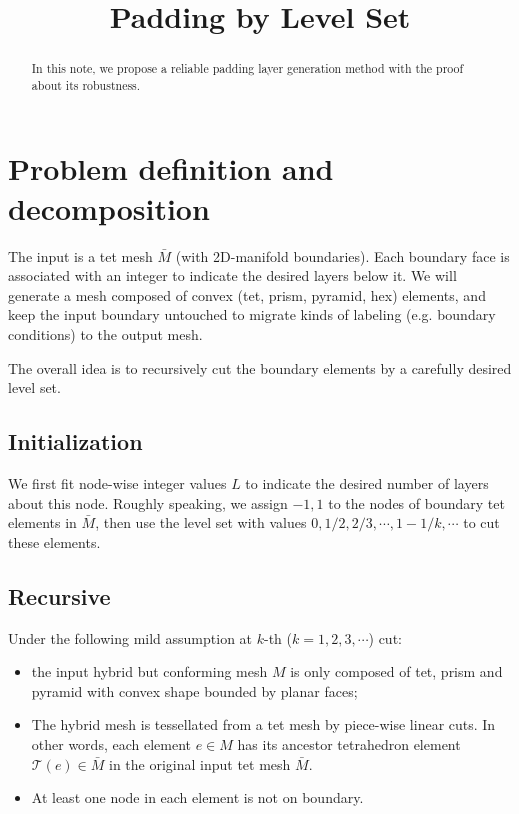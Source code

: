 \documentclass[9pt]{extarticle}
\title{Padding by Level Set}
\begin{document}
\maketitle

\begin{abstract}
  In this note, we propose a reliable padding layer generation method
  with the proof about its robustness.
\end{abstract}

\section{Problem definition and decomposition}
The input is a tet mesh $\bar{M}$ (with 2D-manifold boundaries). Each
boundary face is associated with an integer to indicate the desired
layers below it.  We will generate a mesh composed of convex (tet,
prism, pyramid, hex) elements, and keep the input boundary untouched
to migrate kinds of labeling (e.g. boundary conditions) to the output
mesh.

The overall idea is to recursively cut the boundary elements by a
carefully desired level set.

\subsection{Initialization}

We first fit node-wise integer values $L$ to indicate the desired
number of layers about this node.  Roughly speaking, we assign $-1, 1$
to the nodes of boundary tet elements in $\bar{M}$, then use the level
set with values $0, 1/2, 2/3, \cdots, 1-1/k,\cdots$ to cut these
elements.

\subsection{Recursive}

Under the following mild assumption at $k$-th ($k=1,2,3,\cdots$) cut:
\begin{itemize}
\item the input hybrid but conforming mesh $M$ is only composed of
  tet, prism and pyramid with convex shape bounded by planar faces;
\item The hybrid mesh is tessellated from a tet mesh by piece-wise
  linear cuts.  In other words, each element $e \in M$ has its
  ancestor tetrahedron element $\mathcal{T}(e) \in \bar{M}$ in the
  original input tet mesh $\bar{M}$.
\item At least one node in each element is not on boundary.
\end{itemize}
\end{document}
